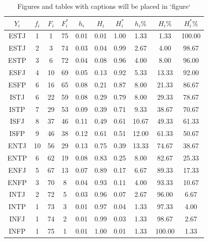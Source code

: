 \documentclass[10pt,]{krantz}
\theoremstyle{definition}
\theoremstyle{definition}
\theoremstyle{definition}
\theoremstyle{definition}
\theoremstyle{remark}
\begin{document}
\begin{longtable}[t]{cccccccccc}
\caption{\label{tab:2w3}Figures and tables with captions will be placed in `figure` }\\
\toprule
$Y_i$ & $f_i$ & $F_i$ & $F_i^*$ & $h_i$ & $H_i$ & $H_i^*$ & $h_i\%$ & $H_i\%$ & $H_i^*\%$\\
\midrule
ESTJ & 1 & 1 & 75 & 0.01 & 0.01 & 1.00 & 1.33 & 1.33 & 100.00\\
ESTJ & 2 & 3 & 74 & 0.03 & 0.04 & 0.99 & 2.67 & 4.00 & 98.67\\
ESTP & 3 & 6 & 72 & 0.04 & 0.08 & 0.96 & 4.00 & 8.00 & 96.00\\
ESFJ & 4 & 10 & 69 & 0.05 & 0.13 & 0.92 & 5.33 & 13.33 & 92.00\\
ESFP & 6 & 16 & 65 & 0.08 & 0.21 & 0.87 & 8.00 & 21.33 & 86.67\\
ISTJ & 6 & 22 & 59 & 0.08 & 0.29 & 0.79 & 8.00 & 29.33 & 78.67\\
ISTP & 7 & 29 & 53 & 0.09 & 0.39 & 0.71 & 9.33 & 38.67 & 70.67\\
ISFJ & 8 & 37 & 46 & 0.11 & 0.49 & 0.61 & 10.67 & 49.33 & 61.33\\
ISFP & 9 & 46 & 38 & 0.12 & 0.61 & 0.51 & 12.00 & 61.33 & 50.67\\
ENTJ & 10 & 56 & 29 & 0.13 & 0.75 & 0.39 & 13.33 & 74.67 & 38.67\\
ENTP & 6 & 62 & 19 & 0.08 & 0.83 & 0.25 & 8.00 & 82.67 & 25.33\\
ENFJ & 5 & 67 & 13 & 0.07 & 0.89 & 0.17 & 6.67 & 89.33 & 17.33\\
ENFP & 3 & 70 & 8 & 0.04 & 0.93 & 0.11 & 4.00 & 93.33 & 10.67\\
INTJ & 2 & 72 & 5 & 0.03 & 0.96 & 0.07 & 2.67 & 96.00 & 6.67\\
INTP & 1 & 73 & 3 & 0.01 & 0.97 & 0.04 & 1.33 & 97.33 & 4.00\\
INFJ & 1 & 74 & 2 & 0.01 & 0.99 & 0.03 & 1.33 & 98.67 & 2.67\\
INFP & 1 & 75 & 1 & 0.01 & 1.00 & 0.01 & 1.33 & 100.00 & 1.33\\
\bottomrule
\end{longtable}
\end{document}
